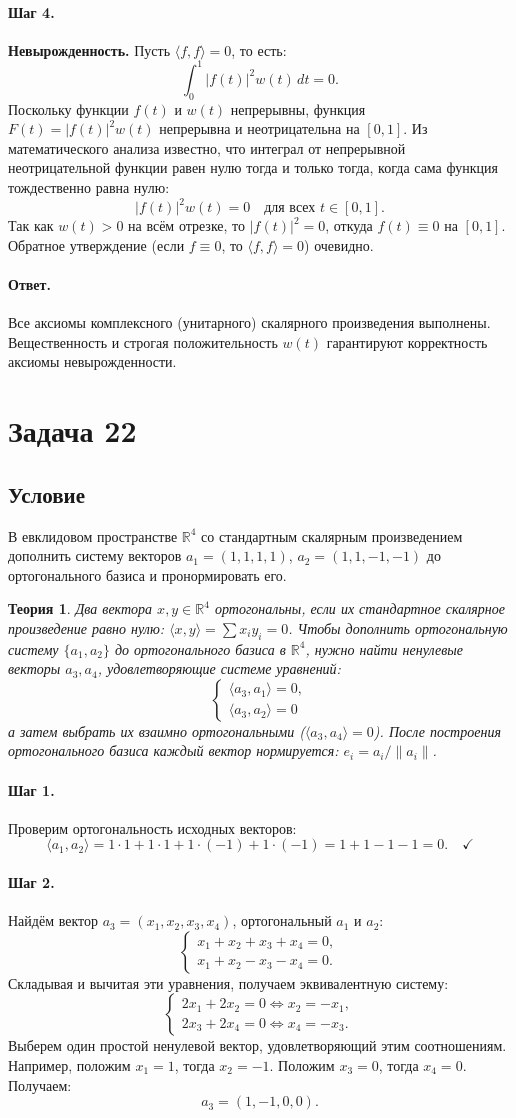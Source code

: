 \documentclass[12pt,a4paper]{article}
\theoremstyle{solution}
\newtheorem*{theory}{Теория}
\newcommand{\task}[1]{\newpage\section*{Задача #1}}
\newcommand{\answer}{\paragraph{Ответ.}}
\newcommand{\step}[1]{\paragraph{Шаг #1.}}
\newcommand{\R}{\mathbb{R}}
\begin{document}
\step{4} \textbf{Невырожденность.} Пусть $\langle f, f\rangle = 0$, то есть:
\[
\int_0^1 |f(t)|^2 w(t)\,dt = 0.
\]
Поскольку функции $f(t)$ и $w(t)$ непрерывны, функция $F(t) = |f(t)|^2 w(t)$ непрерывна и неотрицательна на $[0, 1]$. Из математического анализа известно, что интеграл от непрерывной неотрицательной функции равен нулю тогда и только тогда, когда сама функция тождественно равна нулю:
\[
|f(t)|^2 w(t) = 0 \quad \text{для всех } t \in [0, 1].
\]
Так как $w(t) > 0$ на всём отрезке, то $|f(t)|^2 = 0$, откуда $f(t) \equiv 0$ на $[0, 1]$. Обратное утверждение (если $f \equiv 0$, то $\langle f, f\rangle = 0$) очевидно. \quad\checkmark

\answer
Все аксиомы комплексного (унитарного) скалярного произведения выполнены. Вещественность и строгая положительность $w(t)$ гарантируют корректность аксиомы невырожденности.

\task{22}
\subsection*{Условие}
В евклидовом пространстве $\R^4$ со стандартным скалярным произведением дополнить систему векторов $a_1 = (1, 1, 1, 1)$, $a_2 = (1, 1, -1, -1)$ до ортогонального базиса и пронормировать его.

\begin{theory}
Два вектора $x, y \in \R^4$ ортогональны, если их стандартное скалярное произведение равно нулю: $\langle x, y\rangle = \sum x_i y_i = 0$. Чтобы дополнить ортогональную систему $\{a_1, a_2\}$ до ортогонального базиса в $\R^4$, нужно найти ненулевые векторы $a_3, a_4$, удовлетворяющие системе уравнений:
\[
\begin{cases}
\langle a_3, a_1\rangle = 0, \\
\langle a_3, a_2\rangle = 0
\end{cases}
\]
а затем выбрать их взаимно ортогональными ($\langle a_3, a_4\rangle = 0$). После построения ортогонального базиса каждый вектор нормируется: $e_i = a_i / \|a_i\|$.
\end{theory}

\step{1} Проверим ортогональность исходных векторов:
\[
\langle a_1, a_2\rangle = 1\cdot 1 + 1\cdot 1 + 1\cdot(-1) + 1\cdot(-1) = 1 + 1 - 1 - 1 = 0. \quad\checkmark
\]

\step{2} Найдём вектор $a_3 = (x_1, x_2, x_3, x_4)$, ортогональный $a_1$ и $a_2$:
\[
\begin{cases}
x_1 + x_2 + x_3 + x_4 = 0, \\
x_1 + x_2 - x_3 - x_4 = 0.
\end{cases}
\]
Складывая и вычитая эти уравнения, получаем эквивалентную систему:
\[
\begin{cases}
2x_1 + 2x_2 = 0 \iff x_2 = -x_1, \\
2x_3 + 2x_4 = 0 \iff x_4 = -x_3.
\end{cases}
\]
Выберем один простой ненулевой вектор, удовлетворяющий этим соотношениям. Например, положим $x_1 = 1$, тогда $x_2 = -1$. Положим $x_3 = 0$, тогда $x_4 = 0$. Получаем:
\[
a_3 = (1, -1, 0, 0).
\]
\end{document}
